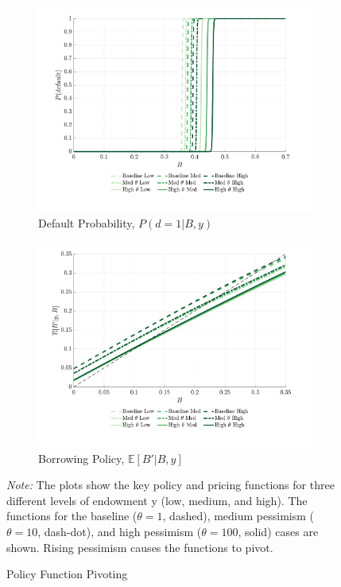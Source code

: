 \documentclass[12pt]{article}
\theoremstyle{plain}
\begin{document}
\begin{figure}[h!]
\begin{subfigure}[b]{0.48\textwidth}
		\centering
		\includegraphics[width=\textwidth]{../../pessimism-default-model/results/comparison_figure_2.pdf}
		\caption{Default Probability, $P(d=1|B,y)$}
		\label{fig:pivot_default}
	\end{subfigure}
	\hfill
	\begin{subfigure}[b]{0.48\textwidth}
		\centering
		\includegraphics[width=\textwidth]{../../pessimism-default-model/results/comparison_figure_9.pdf}
		\caption{Borrowing Policy, $\mathbb{E}[B'|B,y]$}
		\label{fig:pivot_borrowing}
	\end{subfigure}
	\caption{Policy Function Pivoting}
	\label{fig:policy_pivot}
	\parbox{\linewidth}{\small\textit{Note:} The plots show the key policy and pricing functions for three different levels of endowment y (low, medium, and high). The functions for the baseline ($\theta=1$, dashed), medium pessimism ($\theta=10$, dash-dot), and high pessimism ($\theta=100$, solid) cases are shown. Rising pessimism causes the functions to pivot.}
\end{figure}
\end{document}
